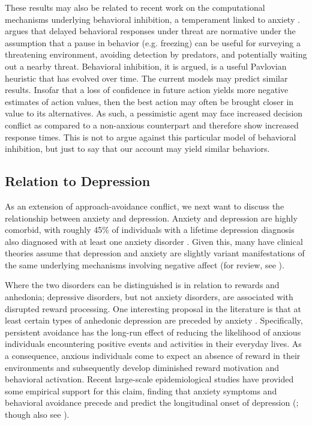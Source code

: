 \documentclass[11pt]{article} %
\begin{document}
These results may also be related to recent work on the computational mechanisms underlying behavioral inhibition, a temperament linked to anxiety \citep{bach2015, khemka2017}. \cite{bach2015} argues that delayed behavioral responses under threat are normative under the assumption that a pause in behavior (e.g. freezing) can be useful for surveying a threatening environment, avoiding detection by predators, and potentially waiting out a nearby threat. Behavioral inhibition, it is argued, is a useful Pavlovian heuristic that has evolved over time. The current models may predict similar results. Insofar that a loss of confidence in future action yields more negative estimates of action values, then the best action may often be brought closer in value to its alternatives. As such, a pessimistic agent may face increased decision conflict as compared to a non-anxious counterpart and therefore show increased response times. This is not to argue against this particular model of behavioral inhibition, but just to say that our account may yield similar behaviors.

\subsection{Relation to Depression}

As an extension of approach-avoidance conflict, we next want to discuss the relationship between anxiety and depression. Anxiety and depression are highly comorbid, with roughly 45\% of individuals with a lifetime depression diagnosis also diagnosed with at least one anxiety disorder \citep{kessler2015}. Given this, many have clinical theories assume that depression and anxiety are slightly variant manifestations of the same underlying mechanisms involving negative affect (for review, see \cite{jacobson2014}).

Where the two disorders can be distinguished is in relation to rewards and anhedonia; depressive disorders, but not anxiety disorders, are associated with disrupted reward processing. One interesting proposal in the literature is that at least certain types of anhedonic depression are preceded by anxiety \citep{alloy1990, moitra2008, jacobson2014}. Specifically, persistent avoidance has the long-run effect of reducing the likelihood of anxious individuals encountering positive events and activities in their everyday lives. As a consequence, anxious individuals come to expect an absence of reward in their environments and subsequently develop diminished reward motivation and behavioral activation. Recent large-scale epidemiological studies have provided  some empirical support for this claim, finding that anxiety symptoms and behavioral avoidance precede and predict the longitudinal onset of depression (\cite{mathew2011, jacobson2014, kessler2015}; though also see \cite{jacobson2017, plana2019}).
\end{document}
